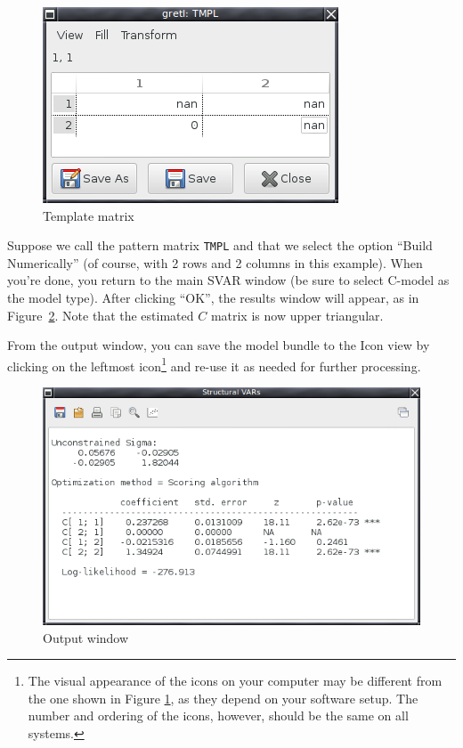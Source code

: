 \documentclass[a4paper,10pt]{article}
\begin{document}
\begin{figure}[htbp]
  \centering
  \includegraphics[scale=0.5]{TMPL.png}
  \caption{Template matrix}
  \label{fig:tmpl}
\end{figure}

Suppose we call the pattern matrix \texttt{TMPL} and that we select
the option ``Build Numerically'' (of course, with 2 rows and 2 columns
in this example).  When you're done, you return to the main SVAR
window (be sure to select C-model as the model type). After clicking
``OK'', the results window will appear, as in
Figure~\ref{fig:GUI-output}. Note that the estimated $C$ matrix is now
upper triangular.

From the output window, you can save the model bundle to the Icon view
by clicking on the leftmost icon\footnote{The visual appearance of the
  icons on your computer may be different from the one shown in Figure
  \ref{fig:tmpl}, as they depend on your software setup.  The number
  and ordering of the icons, however, should be the same on all
  systems.} and re-use it as needed for further processing.
\begin{figure}[htbp]
  \centering
  \includegraphics[scale=0.5]{Output.png}
  \caption{Output window}
  \label{fig:GUI-output}
\end{figure}
\end{document}
